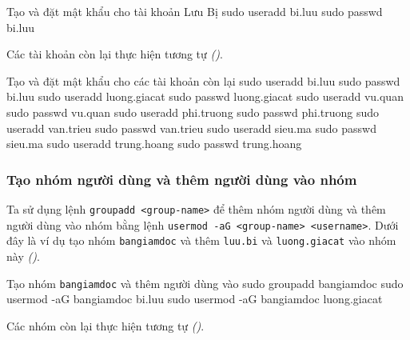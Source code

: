 
\vspace{0.5cm}
\begin{bashlisting}{Tạo và đặt mật khẩu cho tài khoản Lưu Bị}
  sudo useradd bi.luu
  sudo passwd bi.luu
\end{bashlisting}

Các tài khoản còn lại thực hiện tương tự \textit{()}.


\vspace{0.5cm}
\begin{bashlisting}{Tạo và đặt mật khẩu cho các tài khoản còn lại}
  sudo useradd bi.luu
  sudo passwd bi.luu
  sudo useradd luong.giacat
  sudo passwd luong.giacat
  sudo useradd vu.quan
  sudo passwd vu.quan
  sudo useradd phi.truong
  sudo passwd phi.truong
  sudo useradd van.trieu
  sudo passwd van.trieu
  sudo useradd sieu.ma
  sudo passwd sieu.ma
  sudo useradd trung.hoang
  sudo passwd trung.hoang
\end{bashlisting}

\subsubsection{Tạo nhóm người dùng và thêm người dùng vào nhóm}

Ta sử dụng lệnh \texttt{groupadd <group-name>} để thêm nhóm người dùng và thêm người dùng
vào nhóm bằng lệnh \texttt{usermod -aG <group-name> <username>}. Dưới đây là ví dụ tạo
nhóm \texttt{bangiamdoc} và thêm \texttt{luu.bi} và \texttt{luong.giacat} vào
nhóm này \textit{()}.



\vspace{0.5cm}
\begin{bashlisting}{Tạo nhóm \texttt{bangiamdoc} và thêm người dùng vào}
  sudo groupadd bangiamdoc
  sudo usermod -aG bangiamdoc bi.luu
  sudo usermod -aG bangiamdoc luong.giacat
\end{bashlisting}

Các nhóm còn lại thực hiện tương tự \textit{()}.



